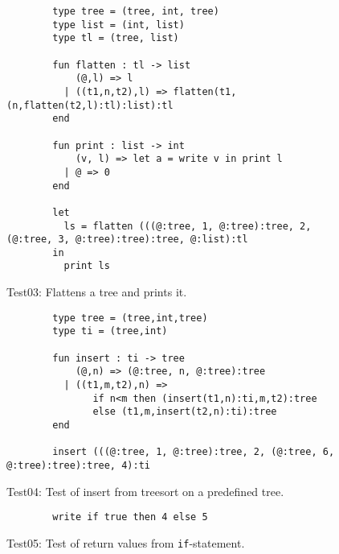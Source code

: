 \begin{figure}
    \centering
    \begin{lstlisting}
        type tree = (tree, int, tree)
        type list = (int, list)
        type tl = (tree, list)

        fun flatten : tl -> list
            (@,l) => l
          | ((t1,n,t2),l) => flatten(t1,(n,flatten(t2,l):tl):list):tl
        end

        fun print : list -> int
            (v, l) => let a = write v in print l
          | @ => 0
        end

        let
          ls = flatten (((@:tree, 1, @:tree):tree, 2, (@:tree, 3, @:tree):tree):tree, @:list):tl
        in
          print ls
    \end{lstlisting}
    \label{fig:tests:test03}
    \caption{Test03: Flattens a tree and prints it.}
\end{figure}

\begin{figure}
    \centering
    \begin{lstlisting}
        type tree = (tree,int,tree)
        type ti = (tree,int)

        fun insert : ti -> tree
            (@,n) => (@:tree, n, @:tree):tree
          | ((t1,m,t2),n) =>
               if n<m then (insert(t1,n):ti,m,t2):tree
               else (t1,m,insert(t2,n):ti):tree
        end

        insert (((@:tree, 1, @:tree):tree, 2, (@:tree, 6, @:tree):tree):tree, 4):ti
    \end{lstlisting}
    \label{fig:tests:test03}
    \caption{Test04: Test of insert from treesort on a predefined tree.}
\end{figure}

\begin{figure}
    \centering
    \begin{lstlisting}
        write if true then 4 else 5
    \end{lstlisting}
    \label{fig:tests:test03}
    \caption{Test05: Test of return values from \texttt{if}-statement.}
\end{figure}
